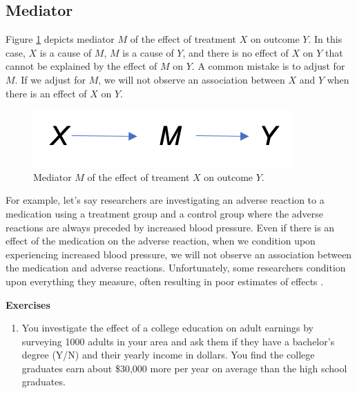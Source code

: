 \documentclass[
]{book}
\providecommand{\tightlist}{%
  \setlength{\itemsep}{0pt}\setlength{\parskip}{0pt}}
\begin{document}
\hypertarget{mediator}{%
\subsection{Mediator}\label{mediator}}

Figure \ref{fig:mediator} depicts mediator \(M\) of the effect of treatment \(X\) on outcome \(Y\). In this case, \(X\) is a cause of \(M\), \(M\) is a cause of \(Y\), and there is no effect of \(X\) on \(Y\) that cannot be explained by the effect of \(M\) on \(Y\). A common mistake is to adjust for \(M\). If we adjust for \(M\), we will not observe an association between \(X\) and \(Y\) when there is an effect of \(X\) on \(Y\).

\begin{figure}
\centering
\includegraphics{./images/mediator.png}
\caption{\label{fig:mediator} Mediator \(M\) of the effect of treament \(X\) on outcome \(Y\).}
\end{figure}

For example, let's say researchers are investigating an adverse reaction to a medication using a treatment group and a control group where the adverse reactions are always preceded by increased blood pressure. Even if there is an effect of the medication on the adverse reaction, when we condition upon experiencing increased blood pressure, we will not observe an association between the medication and adverse reactions. Unfortunately, some researchers condition upon everything they measure, often resulting in poor estimates of effects \citep{hernan2002causal}.

\textbf{Exercises}

\begin{enumerate}
\def\labelenumi{\arabic{enumi}.}
\tightlist
\item
  You investigate the effect of a college education on adult earnings by surveying 1000 adults in your area and ask them if they have a bachelor's degree (Y/N) and their yearly income in dollars. You find the college graduates earn about \$30,000 more per year on average than the high school graduates.
\end{enumerate}
\end{document}
